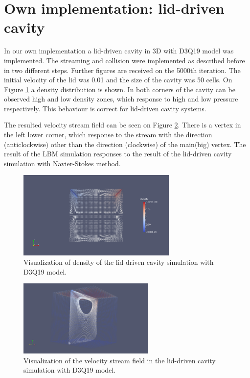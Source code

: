 
\section{Own implementation: lid-driven cavity}

In our own implementation \cite{source} a lid-driven cavity in 3D with D3Q19 model was implemented. The streaming and collision were implemented as described before in two different steps. Further figures are received on the 5000th iteration. The initial velocity of the lid was 0.01 and the size of the cavity was 50 cells. On Figure \ref{fig:density-paraview} a density distribution is shown. In both corners of the cavity can be observed high and low density zones, which response to high and low pressure respectively. This behaviour is correct for lid-driven cavity systems. 

The resulted velocity stream field can be seen on Figure \ref{fig:stream-field-paraview}. There is a vertex in the left lower corner, which response to the stream with the direction (anticlockwise) other than the direction (clockwise) of the main(big) vertex. The result of the LBM simulation responses to the result of the lid-driven cavity simulation with Navier-Stokes method.

\begin{figure}[H]
  \centering
  \includegraphics[width=0.7\textwidth]{img/fig10.png}
  \caption{Visualization of density of the lid-driven cavity simulation with D3Q19 model.}\label{fig:density-paraview}
\end{figure}

\begin{figure}[H]
  \centering
  \includegraphics[width=0.6\textwidth]{img/fig11.png}
  \caption{Visualization of the velocity stream field in the lid-driven cavity simulation with D3Q19 model.}\label{fig:stream-field-paraview}
\end{figure}